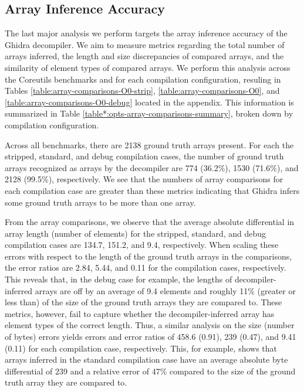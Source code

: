\documentclass[conference]{IEEEtran}
\begin{document}
\subsection{Array Inference Accuracy}

The last major analysis we perform targets the array inference accuracy of the Ghidra decompiler. We aim to measure metrics regarding the total number of arrays inferred, the length and size discrepancies of compared arrays, and the similarity of element types of compared arrays. We perform this analysis across the Coreutils benchmarks and for each compilation configuration, resuling in Tables \ref{table:array-comparisons-O0-strip}, \ref{table:array-comparisons-O0}, and \ref{table:array-comparisons-O0-debug} located in the appendix. This information is summarized in Table \ref{table*:opts-array-comparisons-summary}, broken down by compilation configuration.



Across all benchmarks, there are 2138 ground truth arrays present. For each the stripped, standard, and debug compilation cases, the number of ground truth arrays recognized as arrays by the decompiler are 774 (36.2\%), 1530 (71.6\%), and 2128 (99.5\%), respectively. We see that the numbers of array comparisons for each compilation case are greater than these metrics indicating that Ghidra infers some ground truth arrays to be more than one array.

From the array comparisons, we observe that the average absolute differential in array length (number of elements) for the stripped, standard, and debug compilation cases are 134.7, 151.2, and 9.4, respectively. When scaling these errors with respect to the length of the ground truth arrays in the comparisons, the error ratios are 2.84, 5.44, and 0.11 for the compilation cases, respectively. This reveals that, in the debug case for example, the lengths of decompiler-inferred arrays are off by an average of 9.4 elements and roughly 11\% (greater or less than) of the size of the ground truth arrays they are compared to. These metrics, however, fail to capture whether the decompiler-inferred array has element types of the correct length. Thus, a similar analysis on the size (number of bytes) errors yields errors and error ratios of 458.6 (0.91), 239 (0.47), and 9.41 (0.11) for each compilation case, respectively. This, for example, shows that arrays inferred in the standard compilation case have an average absolute byte differential of 239 and a relative error of 47\% compared to the size of the ground truth array they are compared to.
\end{document}
